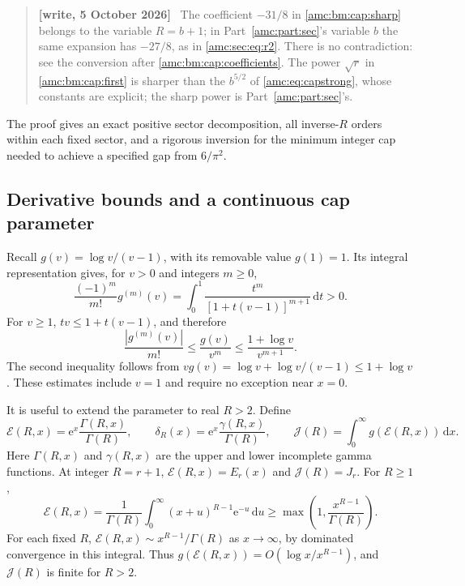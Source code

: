 \documentclass[11pt,letterpaper]{article}
\theoremstyle{remark}\newtheorem{remark}[theorem]{Remark}
\newcommand{\ee}{\mathrm e}
\newcommand{\dd}{\,\mathrm d}
\newenvironment{writenotedated}[1]{\par\smallskip\begin{quote}\small\textbf{[write, #1]}\ }{\end{quote}\smallskip}
\begin{document}
\begin{writenotedated}{5 October 2026}
The coefficient $-31/8$ in \eqref{amc:bm:cap:sharp} belongs to the variable $R=b+1$; in Part~\ref{amc:part:sec}'s variable $b$ the same expansion has $-27/8$, as in \eqref{amc:sec:eq:r2}. There is no contradiction: see the conversion after \eqref{amc:bm:cap:coefficients}. The power $\sqrt r$ in \eqref{amc:bm:cap:first} is sharper than the $b^{5/2}$ of \eqref{amc:eq:capstrong}, whose constants are explicit; the sharp power is Part~\ref{amc:part:sec}'s.
\end{writenotedated}

The proof gives an exact positive sector decomposition, all inverse-$R$ orders within each fixed sector, and a rigorous inversion for the minimum integer cap needed to achieve a specified gap from $6/\pi^2$.

\subsection{Derivative bounds and a continuous cap parameter}
Recall $g(v)=\log v/(v-1)$, with its removable value $g(1)=1$. Its integral representation gives, for $v>0$ and integers $m\ge0$,
\begin{equation}\label{amc:bm:cap:deriv-integral}
 \frac{(-1)^m}{m!}g^{(m)}(v)
 =\int_0^1\frac{t^m}{[1+t(v-1)]^{m+1}}\dd t>0.
\end{equation}
For $v\ge1$, $tv\le1+t(v-1)$, and therefore
\begin{equation}\label{amc:bm:cap:deriv-bound}
 \frac{|g^{(m)}(v)|}{m!}\le\frac{g(v)}{v^m}
 \le\frac{1+\log v}{v^{m+1}}.
\end{equation}
The second inequality follows from
$vg(v)=\log v+\log v/(v-1)\le1+\log v$.
These estimates include $v=1$ and require no exception near $x=0$.

It is useful to extend the parameter to real $R>2$. Define
\begin{equation}\label{amc:bm:cap:continuous}
 \mathcal E(R,x)=\ee^x\frac{\Gamma(R,x)}{\Gamma(R)},\qquad
 \delta_R(x)=\ee^x\frac{\gamma(R,x)}{\Gamma(R)},\qquad
 \mathcal J(R)=\int_0^\infty g(\mathcal E(R,x))\dd x.
\end{equation}
Here $\Gamma(R,x)$ and $\gamma(R,x)$ are the upper and lower incomplete gamma functions. At integer $R=r+1$, $\mathcal E(R,x)=E_r(x)$ and $\mathcal J(R)=J_r$.
For $R\ge1$,
\begin{equation}\label{amc:bm:cap:E-lower}
 \mathcal E(R,x)=\frac1{\Gamma(R)}\int_0^\infty(x+u)^{R-1}\ee^{-u}\dd u
 \ge\max\left(1,\frac{x^{R-1}}{\Gamma(R)}\right).
\end{equation}
For each fixed $R$, $\mathcal E(R,x)\sim x^{R-1}/\Gamma(R)$ as $x\to\infty$, by dominated convergence in this integral. Thus $g(\mathcal E(R,x))=O(\log x/x^{R-1})$, and $\mathcal J(R)$ is finite for $R>2$.
\end{document}
